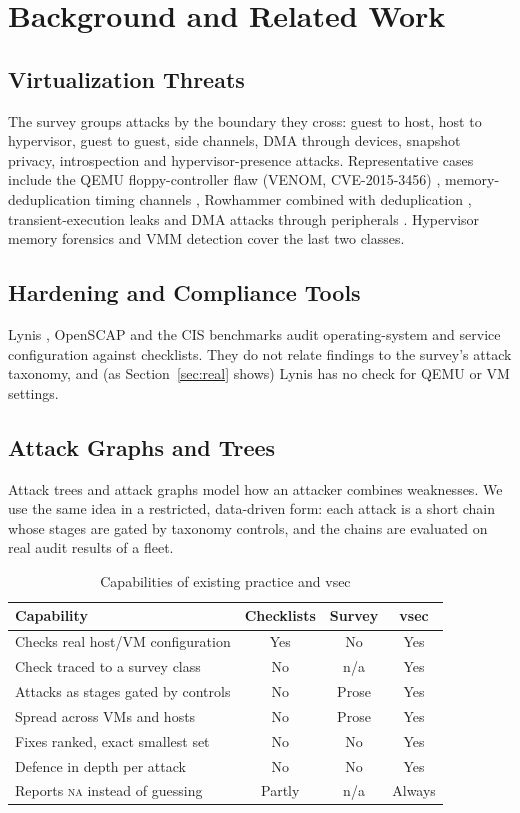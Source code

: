 \documentclass[conference]{IEEEtran}
\newcommand{\na}{\textsc{na}}
\begin{document}
\section{Background and Related Work}
\subsection{Virtualization Threats}
The survey \cite{survey} groups attacks by the boundary they cross: guest to host, host to hypervisor, guest to guest, side channels, DMA through devices, snapshot privacy, introspection and hypervisor-presence attacks. Representative cases include the QEMU floppy-controller flaw (VENOM, CVE-2015-3456) \cite{venom}, memory-deduplication timing channels \cite{suzaki}, Rowhammer combined with deduplication \cite{razavi}, transient-execution leaks \cite{kocher,vanbulck} and DMA attacks through peripherals \cite{markettos}. Hypervisor memory forensics \cite{graziano} and VMM detection \cite{garfinkel,raffetseder} cover the last two classes.

\subsection{Hardening and Compliance Tools}
Lynis \cite{lynis}, OpenSCAP \cite{openscap} and the CIS benchmarks \cite{cis} audit operating-system and service configuration against checklists. They do not relate findings to the survey's attack taxonomy, and (as Section~\ref{sec:real} shows) Lynis has no check for QEMU or VM settings.

\subsection{Attack Graphs and Trees}
Attack trees \cite{schneier} and attack graphs \cite{sheyner,mulval} model how an attacker combines weaknesses. We use the same idea in a restricted, data-driven form: each attack is a short chain whose stages are gated by taxonomy controls, and the chains are evaluated on real audit results of a fleet.

\begin{table}[!t]
\caption{Capabilities of existing practice and vsec}
\label{tab:compare}
\centering\footnotesize
\begin{tabular}{@{}p{3.55cm}ccc@{}}
\toprule
Capability & Checklists & Survey & vsec \\
\midrule
Checks real host/VM configuration & Yes & No & Yes \\
Check traced to a survey class & No & n/a & Yes \\
Attacks as stages gated by controls & No & Prose & Yes \\
Spread across VMs and hosts & No & Prose & Yes \\
Fixes ranked, exact smallest set & No & No & Yes \\
Defence in depth per attack & No & No & Yes \\
Reports \na{} instead of guessing & Partly & n/a & Always \\
\bottomrule
\end{tabular}
\end{table}
\end{document}
